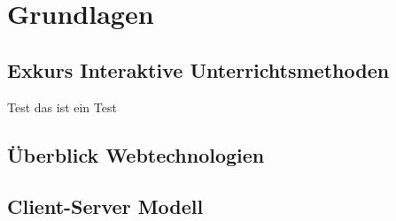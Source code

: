\section{Grundlagen}\label{sec:grundlagen}
\subsection{Exkurs Interaktive Unterrichtsmethoden}\label{sec:interaktiveunterr}

Test das ist ein Test \cite{Malangre2019}

\subsection{Überblick Webtechnologien}\label{sec:webbasedsoftware}

\subsection{Client-Server Modell}\label{sec:clientservermodell}
